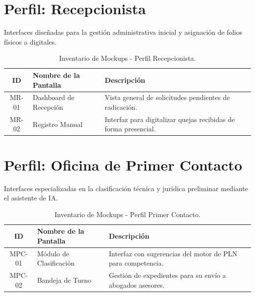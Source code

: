 \begin{appendices}
\newpage
\section{Perfil: Recepcionista}
Interfaces diseñadas para la gestión administrativa inicial y asignación de folios físicos a digitales.

\begin{table}[htbp]
    \centering
    \small
    \begin{tabular}{|c|l|p{7cm}|}
    \hline
    \textbf{ID} & \textbf{Nombre de la Pantalla} & \textbf{Descripción} \\ \hline
    MR-01 & Dashboard de Recepción & Vista general de solicitudes pendientes de radicación. \\ \hline
    MR-02 & Registro Manual & Interfaz para digitalizar quejas recibidas de forma presencial. \\ \hline
    \end{tabular}
    \caption{Inventario de Mockups - Perfil Recepcionista.}
\end{table}

\newpage
\section{Perfil: Oficina de Primer Contacto}
Interfaces especializadas en la clasificación técnica y jurídica preliminar mediante el asistente de IA.

\begin{table}[htbp]
    \centering
    \small
    \begin{tabular}{|c|l|p{7cm}|}
    \hline
    \textbf{ID} & \textbf{Nombre de la Pantalla} & \textbf{Descripción} \\ \hline
    MPC-01 & Módulo de Clasificación & Interfaz con sugerencias del motor de PLN para competencia. \\ \hline
    MPC-02 & Bandeja de Turno & Gestión de expedientes para su envío a abogados asesores. \\ \hline
    \end{tabular}
    \caption{Inventario de Mockups - Perfil Primer Contacto.}
\end{table}


\end{appendices}
